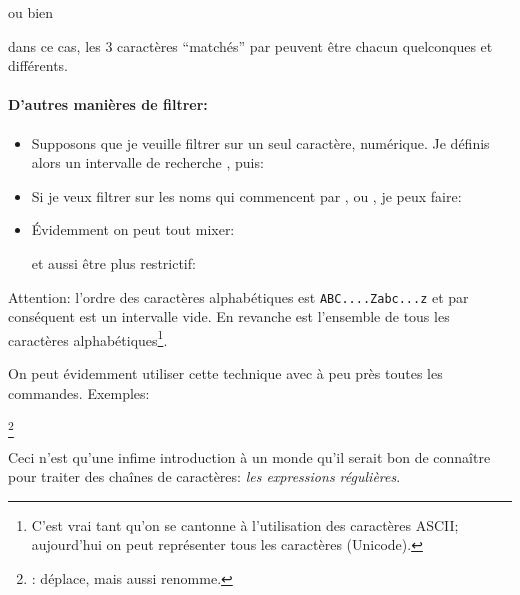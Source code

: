 
ou bien


dans ce cas, les 3 caractères ``matchés'' par  peuvent être
chacun quelconques et différents.

\paragraph{D'autres manières de filtrer:}
\begin{itemize}
\item Supposons que je veuille filtrer sur un seul caractère, numérique. Je
définis alors un intervalle de recherche \ttt{[0-9]}, puis:


\item Si je veux filtrer sur les noms qui commencent par ,
   ou , je peux 
faire:


\item Évidemment on peut tout mixer:


et aussi être plus restrictif:

\end{itemize}

Attention: l'ordre des caractères alphabétiques est
\texttt{ABC....Zabc...z} et par 
conséquent \ttt{[a-B]} est un intervalle vide. En revanche \ttt{[A-z]}
est l'ensemble de tous les caractères alphabétiques\footnote{C'est
  vrai tant qu'on se cantonne à l'utilisation des caractères ASCII;
  aujourd'hui on peut représenter \og tous\fg{} les caractères (Unicode).}. 


  On peut évidemment utiliser cette technique avec à peu près toutes les
  commandes.
  Exemples:


  \footnote{: déplace, mais aussi renomme.}

  \begin{center}
    \begin{boxedminipage}{0.75\linewidth}
   Ceci n'est qu'une infime introduction à un monde qu'il serait bon de
  connaître pour traiter des chaînes de caractères: \emph{les
    expressions régulières}.
    \end{boxedminipage}
  \end{center}



